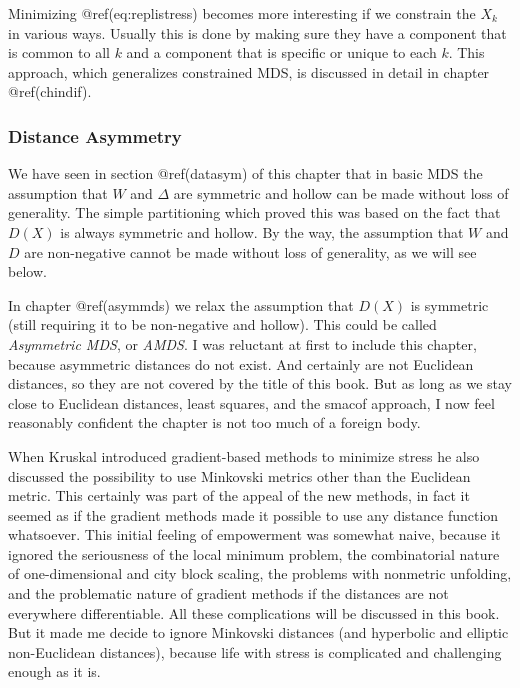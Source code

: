 \documentclass[
  12pt,
  letterpaper,
  DIV=11,
  numbers=noendperiod]{scrartcl}
\begin{document}
Minimizing @ref(eq:replistress) becomes more interesting if we constrain
the \(X_k\) in various ways. Usually this is done by making sure they
have a component that is common to all \(k\) and a component that is
specific or unique to each \(k\). This approach, which generalizes
constrained MDS, is discussed in detail in chapter @ref(chindif).

\subsubsection{Distance Asymmetry}\label{genasym}

We have seen in section @ref(datasym) of this chapter that in basic MDS
the assumption that \(W\) and \(\Delta\) are symmetric and hollow can be
made without loss of generality. The simple partitioning which proved
this was based on the fact that \(D(X)\) is always symmetric and hollow.
By the way, the assumption that \(W\) and \(D\) are non-negative cannot
be made without loss of generality, as we will see below.

In chapter @ref(asymmds) we relax the assumption that \(D(X)\) is
symmetric (still requiring it to be non-negative and hollow). This could
be called \emph{Asymmetric MDS}, or \emph{AMDS}. I was reluctant at
first to include this chapter, because asymmetric distances do not
exist. And certainly are not Euclidean distances, so they are not
covered by the title of this book. But as long as we stay close to
Euclidean distances, least squares, and the smacof approach, I now feel
reasonably confident the chapter is not too much of a foreign body.

When Kruskal introduced gradient-based methods to minimize stress he
also discussed the possibility to use Minkovski metrics other than the
Euclidean metric. This certainly was part of the appeal of the new
methods, in fact it seemed as if the gradient methods made it possible
to use any distance function whatsoever. This initial feeling of
empowerment was somewhat naive, because it ignored the seriousness of
the local minimum problem, the combinatorial nature of one-dimensional
and city block scaling, the problems with nonmetric unfolding, and the
problematic nature of gradient methods if the distances are not
everywhere differentiable. All these complications will be discussed in
this book. But it made me decide to ignore Minkovski distances (and
hyperbolic and elliptic non-Euclidean distances), because life with
stress is complicated and challenging enough as it is.
\end{document}
